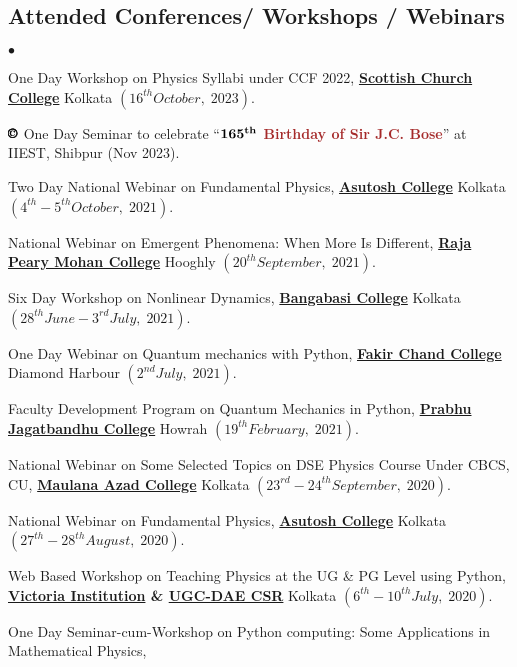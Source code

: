 \documentclass[margin,line]{res}
\newenvironment{list2}{
  \begin{list}{$\bullet$}{%
      \setlength{\itemsep}{0in}
      \setlength{\parsep}{0in} \setlength{\parskip}{0in}
      \setlength{\topsep}{0in} \setlength{\partopsep}{0in} 
      \setlength{\leftmargin}{0.2in}}}{\end{list}}
\begin{document}
\begin{resume}
\section{\sc Attended Conferences/ Workshops / Webinars}
\begin{list2}
\item {\small One Day Workshop on Physics Syllabi under CCF 2022, {\bf \href{https://www.scottishchurch.ac.in/}{Scottish Church College}} Kolkata 
       $(16^{th} October,\; 2023)$.} 
\item[$\pmb\copyright$] {\small One Day Seminar to celebrate ``\textcolor{brown}{\sf \bf ${\bf 165^{th}}$ Birthday of Sir J.C. Bose}'' 
        at IIEST, Shibpur (Nov 2023).}  
\item {\small Two Day National Webinar on Fundamental Physics, {\bf \href{https://asutoshcollege.in/}{Asutosh College}} Kolkata $(4^{th}-5^{th} 
      October,\; 2021)$.} 
\item {\small National Webinar on Emergent Phenomena: When More Is Different, {\bf \href{https://www.rpmcollege.edu.in}{Raja Peary Mohan  
      College}} Hooghly $(20^{th} September,\; 2021)$.}
\item {\small Six Day Workshop on Nonlinear Dynamics, {\bf \href{https://www.bangabasi.ac.in}{Bangabasi College}} Kolkata $(28^{th} June - 3^{rd} 
      July,\; 2021)$.}
\item {\small One Day Webinar on Quantum mechanics with Python, {\bf \href{https://www.rpmcollege.edu.in}{Fakir Chand College}} Diamond Harbour 
      $(2^{nd} July,\; 2021)$.}
\item {\small Faculty Development Program on Quantum Mechanics in Python, {\bf \href{https://pjc.ac.in/}{Prabhu Jagatbandhu College}} Howrah 
      $(19^{th} February,\; 2021)$.} 
\item {\small National Webinar on Some Selected Topics on DSE Physics Course Under CBCS, CU, {\bf \href{https://maulanaazadcollegekolkata.ac.in/}{
      Maulana Azad College}} Kolkata $(23^{rd}-24^{th} September,\; 2020)$.} 
\item {\small National Webinar on Fundamental Physics, {\bf \href{https://asutoshcollege.in/}{Asutosh College}} Kolkata $(27^{th}-28^{th} 
      August,\; 2020)$.} 
\item {\small Web Based Workshop on Teaching Physics at the UG \& PG Level using Python, {\bf \href{https://www.victoriacollege.co.in/}{Victoria 
      Institution} \& \href{http://www.iuc.res.in/}{UGC-DAE CSR}} Kolkata $(6^{th}-10^{th} July,\; 2020)$.}
\item {\small One Day Seminar-cum-Workshop on Python computing: Some Applications in Mathematical Physics, {\bf 
}}
\end{list2}
\end{resume}
\end{document}
